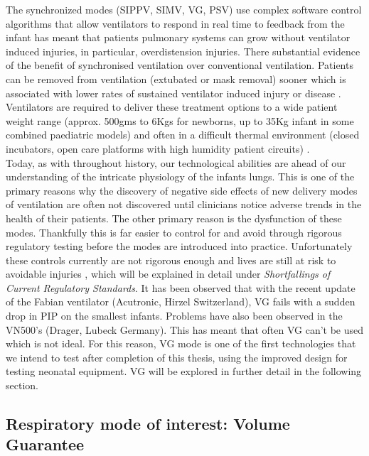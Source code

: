 \documentclass[12pt, openany, oneside]{book}
\begin{document}
The synchronized modes (SIPPV, SIMV, VG, PSV) use complex software control algorithms that allow ventilators to respond in real time to feedback from the infant has meant that patients pulmonary systems can grow without ventilator induced injuries, in particular, overdistension injuries. There substantial evidence of the benefit of synchronised ventilation over conventional ventilation. Patients can be removed from ventilation (extubated or mask removal) sooner which is associated with lower rates of sustained ventilator induced injury or disease \cite{evidence, mccallion2008, mccallion2005}. Ventilators are required to deliver these treatment options to a wide patient weight range (approx. 500gms to 6Kgs for newborns, up to 35Kg infant in some combined paediatric models) and often in a difficult thermal environment (closed incubators, open care platforms with high humidity patient circuits) \cite{muzza}.\\


Today, as with throughout history, our technological abilities are ahead of our understanding of the intricate physiology of the infants lungs. This is one of the primary reasons why the discovery of negative side effects of new delivery modes of ventilation are often not discovered until clinicians notice adverse trends in the health of their patients. The other primary reason is the dysfunction of these modes. Thankfully this is far easier to control for and avoid through rigorous regulatory testing before the modes are introduced into practice. Unfortunately these controls currently are not rigorous enough and lives are still at risk to avoidable injuries \cite{muzza, mark, hinder2016, mccallion2005}, which will be explained in detail under \textit{Shortfallings of Current Regulatory Standards}. It has been observed that with the recent update of the Fabian ventilator (Acutronic, Hirzel Switzerland), VG fails with a sudden drop in PIP on the smallest infants. Problems have also been observed in the VN500's (Drager, Lubeck Germany). This has meant that often VG can't be used which is not ideal. For this reason, VG mode is one of the first technologies that we intend to test after completion of this thesis, using the improved design for testing neonatal equipment. VG will be explored in further detail in the following section.



\subsection{Respiratory mode of interest: Volume Guarantee}
\end{document}
